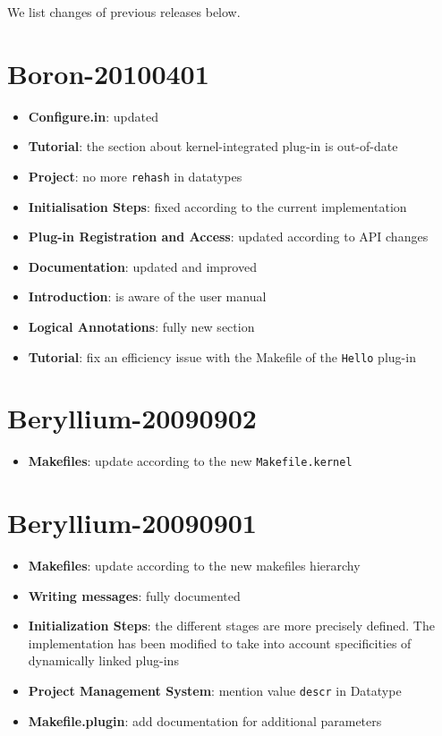 We list changes of previous releases below.

\section*{Boron-20100401}

\begin{itemize}
\item \textbf{Configure.in}: updated
\item \textbf{Tutorial}: the section about kernel-integrated plug-in is
  out-of-date
\item \textbf{Project}: no more \texttt{rehash} in datatypes
\item \textbf{Initialisation Steps}: fixed according to the current
  implementation
\item \textbf{Plug-in Registration and Access}: updated according to API
  changes
\item \textbf{Documentation}: updated and improved
\item \textbf{Introduction}: is aware of the \framac user manual
\item \textbf{Logical Annotations}: fully new section
\item \textbf{Tutorial}: fix an efficiency issue with the Makefile of the
  \texttt{Hello} plug-in
\end{itemize}

\section*{Beryllium-20090902}

\begin{itemize}
\item \textbf{Makefiles}: update according to the new \texttt{Makefile.kernel}
\end{itemize}

\section*{Beryllium-20090901}

\begin{itemize}
\item \textbf{Makefiles}: update according to the new makefiles hierarchy
\item \textbf{Writing messages}: fully documented
\item \textbf{Initialization Steps}: the different stages are more
  precisely defined. The implementation has been modified to take into
  account specificities of dynamically linked plug-ins
\item \textbf{Project Management System}: mention value \texttt{descr} in
  Datatype
\item \textbf{Makefile.plugin}: add documentation for additional parameters
\end{itemize}


